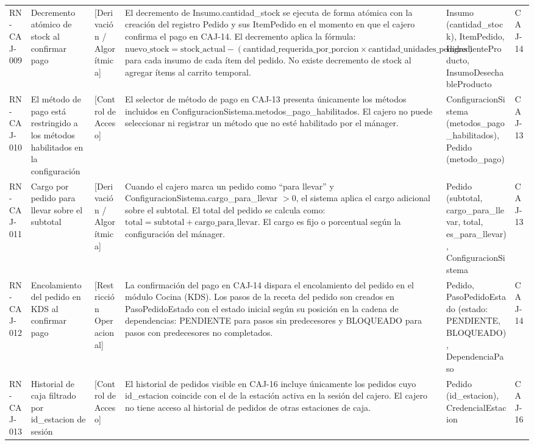 \begin{landscape}
\begin{longtable}[c]{l p{2.1cm} p{2.1cm} p{8cm} p{4cm} p{3cm}}
RN-CAJ-009 & Decremento atómico de stock al confirmar pago & [Derivación / Algorítmica] & El decremento de Insumo.cantidad\_stock se ejecuta de forma atómica con la creación del registro Pedido y sus ItemPedido en el momento en que el cajero confirma el pago en CAJ-14. El decremento aplica la fórmula: $\text{nuevo\_stock} = \text{stock\_actual} - (\text{cantidad\_requerida\_por\_porcion} \times \text{cantidad\_unidades\_pedidas})$ para cada insumo de cada ítem del pedido. No existe decremento de stock al agregar ítems al carrito temporal. & Insumo (cantidad\_stock), ItemPedido, IngredienteProducto, InsumoDesechableProducto & CAJ-14 \\
\addlinespace
RN-CAJ-010 & El método de pago está restringido a los métodos habilitados en la configuración & [Control de Acceso] & El selector de método de pago en CAJ-13 presenta únicamente los métodos incluidos en ConfiguracionSistema.metodos\_pago\_habilitados. El cajero no puede seleccionar ni registrar un método que no esté habilitado por el mánager. & ConfiguracionSistema (metodos\_pago\_habilitados), Pedido (metodo\_pago) & CAJ-13 \\
\addlinespace
RN-CAJ-011 & Cargo por pedido para llevar sobre el subtotal & [Derivación / Algorítmica] & Cuando el cajero marca un pedido como ``para llevar'' y ConfiguracionSistema.cargo\_para\_llevar $> 0$, el sistema aplica el cargo adicional sobre el subtotal. El total del pedido se calcula como: $\text{total} = \text{subtotal} + \text{cargo\_para\_llevar}$. El cargo es fijo o porcentual según la configuración del mánager. & Pedido (subtotal, cargo\_para\_llevar, total, es\_para\_llevar), ConfiguracionSistema & CAJ-13 \\
\addlinespace
RN-CAJ-012 & Encolamiento del pedido en KDS al confirmar pago & [Restricción Operacional] & La confirmación del pago en CAJ-14 dispara el encolamiento del pedido en el módulo Cocina (KDS). Los pasos de la receta del pedido son creados en PasoPedidoEstado con el estado inicial según su posición en la cadena de dependencias: PENDIENTE para pasos sin predecesores y BLOQUEADO para pasos con predecesores no completados. & Pedido, PasoPedidoEstado (estado: PENDIENTE, BLOQUEADO), DependenciaPaso & CAJ-14 \\
\addlinespace
RN-CAJ-013 & Historial de caja filtrado por id\_estacion de sesión & [Control de Acceso] & El historial de pedidos visible en CAJ-16 incluye únicamente los pedidos cuyo id\_estacion coincide con el de la estación activa en la sesión del cajero. El cajero no tiene acceso al historial de pedidos de otras estaciones de caja. & Pedido (id\_estacion), CredencialEstacion & CAJ-16 \\

\end{longtable}
\end{landscape}
